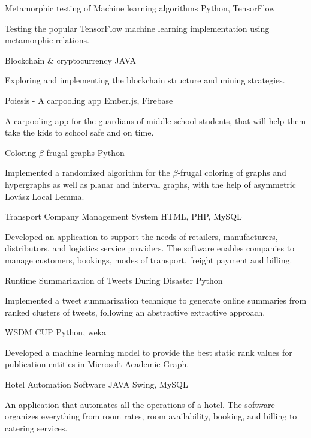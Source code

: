 \documentclass{tccv}
\begin{document}
\begin{projectlist}

\item{Metamorphic testing of Machine learning algorithms}
     {Python, TensorFlow}

Testing the popular TensorFlow machine learning implementation using metamorphic relations.

\item{Blockchain \& cryptocurrency}
     {JAVA}

Exploring and implementing the blockchain structure and mining strategies.

\item{Poiesis - A carpooling app}
     {Ember.js, Firebase}

A carpooling app for the guardians of middle school students, that will help them take the kids to school safe and on time.

\item{Coloring $\beta$-frugal graphs}
     {Python}

Implemented a randomized algorithm for the $\beta$-frugal coloring of graphs and hypergraphs as well as planar and interval graphs, with the help of asymmetric Lov\'{a}sz Local Lemma.


\item{Transport Company Management System}
     {HTML, PHP, MySQL}

Developed an application to support the needs of retailers, manufacturers, distributors, and logistics service providers. The software enables companies to manage customers, bookings, modes of transport, freight payment and billing.

\item{Runtime Summarization of Tweets During Disaster}
     {Python}

Implemented a tweet summarization technique to generate online summaries from ranked clusters of tweets, following an abstractive extractive approach.

\item{WSDM CUP}
     {Python, weka}

Developed a machine learning model to  provide the best static rank values for publication entities in Microsoft Academic Graph.

\item{Hotel Automation Software}
     {JAVA Swing, MySQL}

An application that automates all the operations of a hotel. The software organizes everything from room rates, room availability, booking, and billing to catering services.



\end{projectlist}
\end{document}
